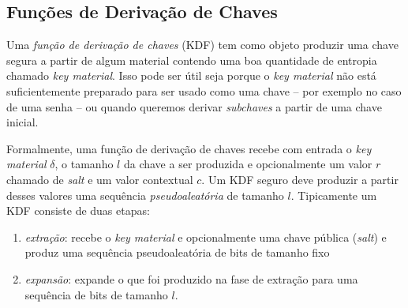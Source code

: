 

\subsection{Funções de Derivação de Chaves}
\label{sec:kdf}

Uma {\em função de derivação de chaves} (KDF) tem como objeto produzir uma chave segura a partir de algum material contendo uma boa quantidade de entropia chamado {\em key material}.
Isso pode ser útil seja porque o {\em key material} não está suficientemente preparado para ser usado como uma chave -- por exemplo no caso de uma senha -- ou quando queremos derivar {\em subchaves} a partir de uma chave inicial.

Formalmente, uma função de derivação de chaves recebe com entrada o {\em key material} $\delta$, o tamanho $l$ da chave a ser produzida e opcionalmente um valor $r$ chamado de {\em salt} e um valor contextual $c$.
Um KDF seguro deve produzir a partir desses valores uma sequência {\em pseudoaleatória} de tamanho $l$.
Tipicamente um KDF consiste de duas etapas: 
\begin{enumerate}
\item {\em extração}: recebe o {\em key material} e opcionalmente uma chave pública ({\em salt}) e produz uma sequência pseudoaleatória de bits de tamanho fixo
\item {\em expansão}: expande o que foi produzido na fase de extração para uma sequência de bits de tamanho $l$.
\end{enumerate}

